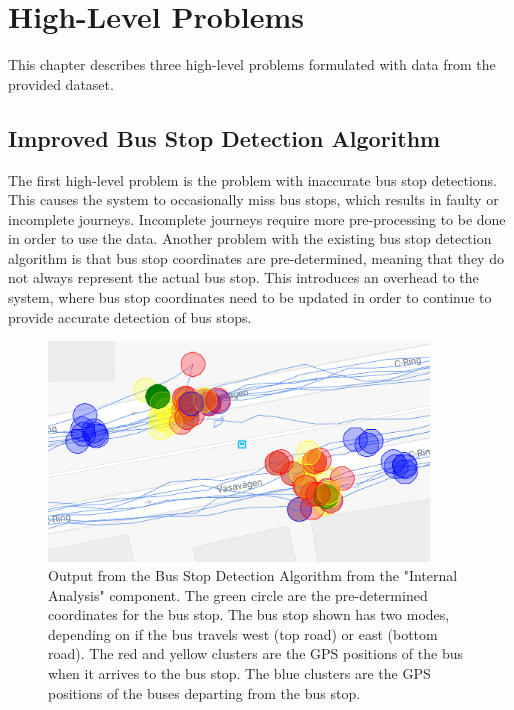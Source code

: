 \chapter{High-Level Problems}
\label{cha:high-level-problems}

This chapter describes three high-level problems formulated with data from the provided dataset.

\section{Improved Bus Stop Detection Algorithm}

The first high-level problem is the problem with inaccurate bus stop detections.
This causes the system to occasionally miss bus stops, which results in faulty or incomplete journeys.
Incomplete journeys require more pre-processing to be done in order to use the data.
Another problem with the existing bus stop detection algorithm is that bus stop coordinates are pre-determined, meaning that they do not always represent the actual bus stop.
This introduces an overhead to the system, where bus stop coordinates need to be updated in order to continue to provide accurate detection of bus stops.

\begin{figure}[ht!]
    \centering
    \includegraphics[width=0.9\textwidth]{figures/bus_stops}
    \caption{Output from the Bus Stop Detection Algorithm from the "Internal Analysis" component.
    The green circle are the pre-determined coordinates for the bus stop.
    The bus stop shown has two modes, depending on if the bus travels west (top road) or east (bottom road).
    The red and yellow clusters are the GPS positions of the bus when it arrives to the bus stop.
    The blue clusters are the GPS positions of the buses departing from the bus stop.
    }
    \label{fig:bus-stop-clusters}
\end{figure}

